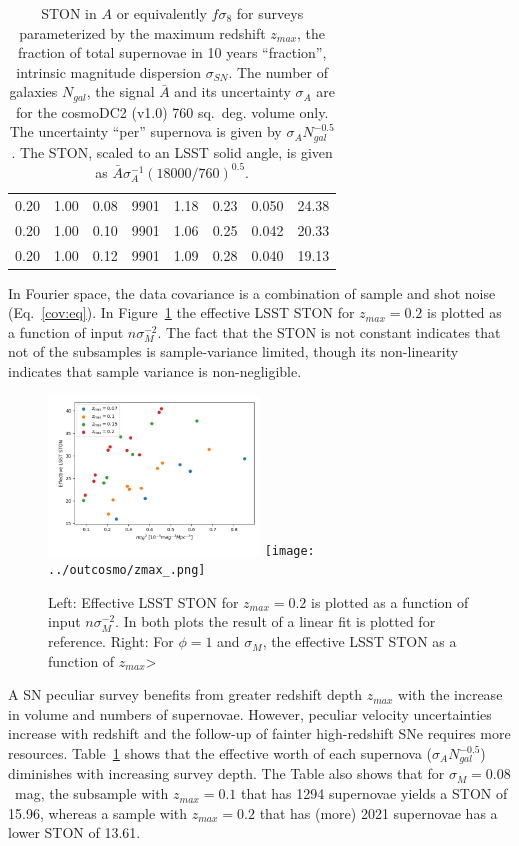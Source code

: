 \documentclass{aastex62}   	%
\begin{document}
\begin{table}
\begin{tabular}{|ccc|ccccc|}
0.20 & 1.00 & 0.08 & 9901 &   1.18 &   0.23 &  0.050 &  24.38 \\
0.20 & 1.00 & 0.10 & 9901 &   1.06 &   0.25 &  0.042 &  20.33 \\
0.20 & 1.00 & 0.12 & 9901 &   1.09 &   0.28 &  0.040 &  19.13 \\
    \hline
   \end{tabular}
   \caption{STON in $A$ or equivalently $f\sigma_8$ for surveys parameterized by the maximum redshift $z_{max}$,
   the fraction of total supernovae in 10 years ``fraction'', intrinsic magnitude dispersion $\sigma_{SN}$.  The number of galaxies
   $N_{gal}$, the signal $\bar{A}$ and its uncertainty $\sigma_A$ are for the cosmoDC2 (v1.0) 760 sq.~deg. volume only.
   The uncertainty ``per'' supernova is given by  $\sigma_A N_{gal}^{-0.5}$.  The STON, scaled to an LSST solid angle, is given as 
    $\bar{A} \sigma_A^{-1} (18000/760)^{0.5}$.
   \label{tab:subsets}}
\end{table}

In Fourier space, the data covariance is a combination of sample and shot noise (Eq.~\ref{cov:eq}).
In Figure~\ref{scaling:fig} the effective LSST STON for $z_{max}=0.2$ is plotted as a function of input $n \sigma^{-2}_M$.
The fact that the STON is not constant indicates that not of the subsamples is sample-variance limited, though its non-linearity
indicates that sample variance is non-negligible.


\begin{figure}
\includegraphics[width=0.5\textwidth]{../outcosmo/fracsnsig2_.png}
\texttt{[image: ../outcosmo/zmax\_.png]}
\caption{Left: Effective LSST STON for $z_{max}=0.2$ is plotted as a function of input  $n \sigma^{-2}_M$.
In both plots the result of a linear fit is plotted for reference. Right: For $\phi=1$ and $\sigma_M$, the  effective LSST STON as
a function of $z_{max}$>
\label{scaling:fig}}
\end{figure}

A SN peculiar survey benefits from greater redshift depth $z_{max}$ with the increase in volume and numbers of supernovae.  However,
peculiar velocity uncertainties increase with redshift and the follow-up of fainter high-redshift SNe requires more resources.  Table~\ref{tab:subsets}
shows that the effective worth of each supernova ($\sigma_A N_{gal}^{-0.5}$) diminishes with increasing survey depth.
The Table also shows that for $\sigma_M=0.08$~mag, the subsample with $z_{max}=0.1$ that has 1294 supernovae yields a STON of 15.96, whereas
a sample with $z_{max}=0.2$ that has (more) 2021 supernovae has a lower STON of 13.61.
\end{document}
